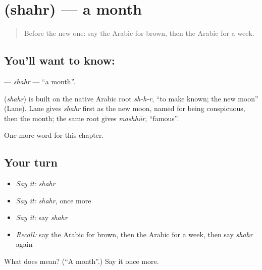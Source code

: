 \section[\texorpdfstring{\ar{شهر} (shahr)}{شهر (shahr)}]{ (shahr) — a month}

\label{lesson:AR-C86-shahr}



\begin{quote}
Before the new one: say the Arabic for brown, then the Arabic for a week.
\end{quote}

\subsection*{You'll want to know: }
\textbf{} — \emph{shahr} — \textquotedblleft{}a month\textquotedblright{}.

\begin{cousinweb}
\textbf{} (\emph{shahr}) is built on the native Arabic root \emph{sh-h-r}, \textquotedblleft{}to make known; the new moon\textquotedblright{} (Lane). Lane gives \emph{shahr} first as the new moon, named for being conspicuous, then the month; the same root gives \emph{mashhūr}, \textquotedblleft{}famous\textquotedblright{}.
\end{cousinweb}

\begin{grammarlens}[title={What you've built}]
One more word for this chapter.
\end{grammarlens}

\subsection*{Your turn}
\begin{itemize}
\raggedright
  \item \emph{Say it:} \emph{shahr}
  \item \emph{Say it:} \emph{shahr}, once more
  \item \emph{Say it:} say \emph{shahr}
  \item \emph{Recall:} say the Arabic for brown, then the Arabic for a week, then say \emph{shahr} again
\end{itemize}

\begin{tcolorbox}[breakable,colback=teal!4,colframe=teal!35!black,title={Before you move on}]
What does  mean? (\textquotedblleft{}A month\textquotedblright{}.) Say it once more.
\end{tcolorbox}
